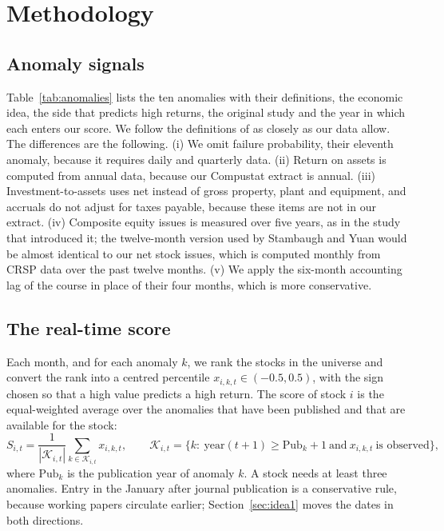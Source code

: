 \documentclass[12pt,a4paper]{article}
\begin{document}
\section{Methodology}\label{sec:method}

\subsection{Anomaly signals}
Table~\ref{tab:anomalies} lists the ten anomalies with their definitions, the economic idea, the side that predicts high returns, the original study and the year in which each enters our score. We follow the definitions of \citet{stambaugh2017} as closely as our data allow. The differences are the following. (i) We omit failure probability, their eleventh anomaly, because it requires daily and quarterly data. (ii) Return on assets is computed from annual data, because our Compustat extract is annual. (iii) Investment-to-assets uses net instead of gross property, plant and equipment, and accruals do not adjust for taxes payable, because these items are not in our extract. (iv) Composite equity issues is measured over five years, as in the study that introduced it; the twelve-month version used by Stambaugh and Yuan would be almost identical to our net stock issues, which is computed monthly from CRSP data over the past twelve months. (v) We apply the six-month accounting lag of the course in place of their four months, which is more conservative.

\subsection{The real-time score}
Each month, and for each anomaly $k$, we rank the stocks in the universe and convert the rank into a centred percentile $x_{i,k,t}\in(-0.5,0.5)$, with the sign chosen so that a high value predicts a high return. The score of stock $i$ is the equal-weighted average over the anomalies that have been published and that are available for the stock:
\begin{equation}
S_{i,t}=\frac{1}{|\mathcal{K}_{i,t}|}\sum_{k\in\mathcal{K}_{i,t}}x_{i,k,t},\qquad \mathcal{K}_{i,t}=\{k:\ \text{year}(t+1)\ge \text{Pub}_k+1\ \text{and}\ x_{i,k,t}\ \text{is observed}\},
\end{equation}
where $\text{Pub}_k$ is the publication year of anomaly $k$. A stock needs at least three anomalies. Entry in the January after journal publication is a conservative rule, because working papers circulate earlier; Section~\ref{sec:idea1} moves the dates in both directions.
\end{document}
